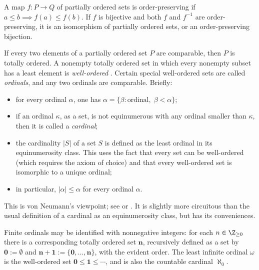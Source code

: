 A map $f:P\to Q$ of partially ordered sets is order-preserving if $a\leq b\implies f(a)\leq f(b)$. If $f$ is bijective and both $f$ and $f^{-1}$ are order-preserving, it is an isomorphism of partially ordered sets, or an order-preserving bijection.

If every two elements of a partially ordered set $P$ are comparable, then $P$ is totally ordered. A nonempty totally ordered set in which every nonempty subset has a least element is \emph{well-ordered}
. Certain special well-ordered sets are called \emph{ordinals}, and any two ordinals are comparable. Briefly:

\begin{itemize}
	\item for every ordinal $\alpha$, one has $\alpha=\{\beta:\text{ordinal},\;\beta<\alpha\}$;
	\item if an ordinal $\kappa$, as a set, is not equinumerous with any ordinal smaller than $\kappa$, then it is called a \emph{cardinal};
	\item the cardinality $|S|$ of a set $S$ is defined as the least ordinal in its equinumerosity class. This uses the fact that every set can be well-ordered (which requires the axiom of choice) and that every well-ordered set is isomorphic to a unique ordinal;
	\item in particular, $|\alpha|\leq\alpha$ for every ordinal $\alpha$.
\end{itemize}

This is von Neumann's viewpoint; see \cite[\S~1.2]{Li1} or \cite{Je03}. It is slightly more circuitous than the usual definition of a cardinal as an equinumerosity class, but has its conveniences.

Finite ordinals may be identified with nonnegative integers: for each $n\in\Z_{\geq0}$ there is a corresponding totally ordered set $\mathbf n$, recursively defined as a set by $\mathbf0:=\emptyset$ and $\mathbf{n+1}:=\{\mathbf0,\ldots,\mathbf n\}$, with the evident order. The least infinite ordinal $\omega$ is the well-ordered set $\mathbf0\leq\mathbf1\leq\cdots$, and is also the countable cardinal $\aleph_0$.

